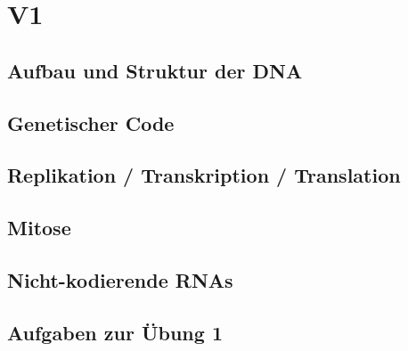 \section{V1}
\subsection{Aufbau und Struktur der DNA}

\subsection{Genetischer Code}

\subsection{Replikation / Transkription / Translation}

\subsection{Mitose}

\subsection{Nicht-kodierende RNAs}

\subsection{Aufgaben zur Übung 1}